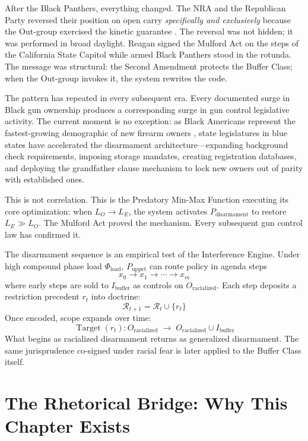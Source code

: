 \documentclass[12pt,openany]{book}
\begin{document}
After the Black Panthers, everything changed. The NRA and the Republican Party reversed their position on open carry \textit{specifically and exclusively} because the Out-group exercised the kinetic guarantee \cite{winkler2011}. The reversal was not hidden; it was performed in broad daylight. Reagan signed the Mulford Act on the steps of the California State Capitol while armed Black Panthers stood in the rotunda. The message was structural: the Second Amendment protects the Buffer Class; when the Out-group invokes it, the system rewrites the code.

The pattern has repeated in every subsequent era. Every documented surge in Black gun ownership produces a corresponding surge in gun control legislative activity. The current moment is no exception: as Black Americans represent the fastest-growing demographic of new firearm owners \cite{nssf2020}, state legislatures in blue states have accelerated the disarmament architecture---expanding background check requirements, imposing storage mandates, creating registration databases, and deploying the grandfather clause mechanism to lock new owners out of parity with established ones.

This is not correlation. This is the Predatory Min-Max Function executing its core optimization: when $L_O \to L_E$, the system activates $P_{\text{disarmament}}$ to restore $L_E \gg L_O$. The Mulford Act proved the mechanism. Every subsequent gun control law has confirmed it.

\begin{keyinsight}
The disarmament sequence is an empirical test of the Interference Engine. Under high compound phase load $\Phi_{\text{load}}$, $P_{\text{uppet}}$ can route policy in agenda steps
\[
x_0 \rightarrow x_1 \rightarrow \cdots \rightarrow x_m
\]
where early steps are sold to $I_{\text{buffer}}$ as controls on $O_{\text{racialized}}$. Each step deposits a restriction precedent $r_t$ into doctrine:
\[
\mathcal{R}_{t+1}=\mathcal{R}_t \cup \{r_t\}
\]
Once encoded, scope expands over time:
\[
\operatorname{Target}(r_t): O_{\text{racialized}} \;\rightarrow\; O_{\text{racialized}} \cup I_{\text{buffer}}
\]
What begins as racialized disarmament returns as generalized disarmament. The same jurisprudence co-signed under racial fear is later applied to the Buffer Class itself.
\end{keyinsight}

\section{The Rhetorical Bridge: Why This Chapter Exists}
\end{document}
